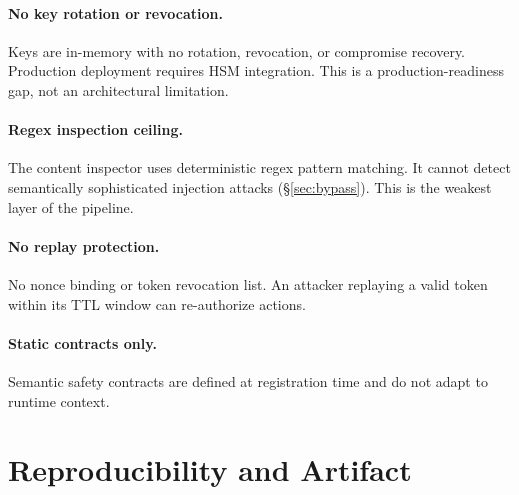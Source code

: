 \documentclass[11pt,a4paper]{article}
\begin{document}
\paragraph{No key rotation or revocation.}
Keys are in-memory with no rotation, revocation, or compromise recovery. Production deployment
requires HSM integration. This is a production-readiness gap, not an architectural limitation.

\paragraph{Regex inspection ceiling.}
The content inspector uses deterministic regex pattern matching. It cannot detect semantically
sophisticated injection attacks (\S\ref{sec:bypass}). This is the weakest layer of the pipeline.

\paragraph{No replay protection.}
No nonce binding or token revocation list. An attacker replaying a valid token within its TTL
window can re-authorize actions.

\paragraph{Static contracts only.}
Semantic safety contracts are defined at registration time and do not adapt to runtime context.


\section{Reproducibility and Artifact}\label{sec:reproducibility}
\end{document}
